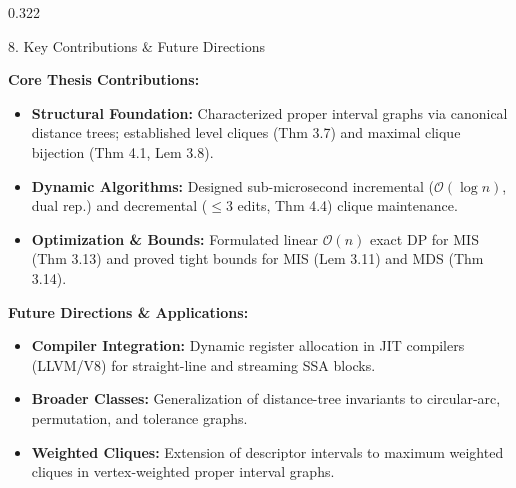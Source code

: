 \documentclass[final,17pt]{beamer}
\begin{document}
\begin{frame}[t]
\begin{columns}[t]
\begin{column}{0.322\textwidth}
    \vspace{33pt}
    \begin{posterbox}{8. Key Contributions \& Future Directions}
        \vspace{2pt}
        \begin{minipage}[t]{0.485\linewidth}
            \textbf{\color{subHeaderNavy}Core Thesis Contributions:}
            \begin{itemize}\setlength{\itemsep}{5.0pt}
                \fontsize{8.6}{11.0}\selectfont
                \item \textbf{Structural Foundation:} Characterized proper interval graphs via canonical distance trees; established level cliques (Thm 3.7) and maximal clique bijection (Thm 4.1, Lem 3.8).
                \item \textbf{Dynamic Algorithms:} Designed sub-microsecond incremental ($\mathcal{O}(\log n)$, dual rep.) and decremental ($\le 3$ edits, Thm 4.4) clique maintenance.
                \item \textbf{Optimization \& Bounds:} Formulated linear $\mathcal{O}(n)$ exact DP for MIS (Thm 3.13) and proved tight bounds for MIS (Lem 3.11) and MDS (Thm 3.14).
            \end{itemize}
        \end{minipage}
        \hfill
        \begin{minipage}[t]{0.485\linewidth}
            \textbf{\color{subHeaderNavy}Future Directions \& Applications:}
            \begin{itemize}\setlength{\itemsep}{5.0pt}
                \fontsize{8.6}{11.0}\selectfont
                \item \textbf{Compiler Integration:} Dynamic register allocation in JIT compilers (LLVM/V8) for straight-line and streaming SSA blocks.
                \item \textbf{Broader Classes:} Generalization of distance-tree invariants to circular-arc, permutation, and tolerance graphs.
                \item \textbf{Weighted Cliques:} Extension of descriptor intervals to maximum weighted cliques in vertex-weighted proper interval graphs.
            \end{itemize}
        \end{minipage}
        \vspace{2pt}
    \end{posterbox}

\end{column}

\end{columns}

\end{frame}
\end{document}
